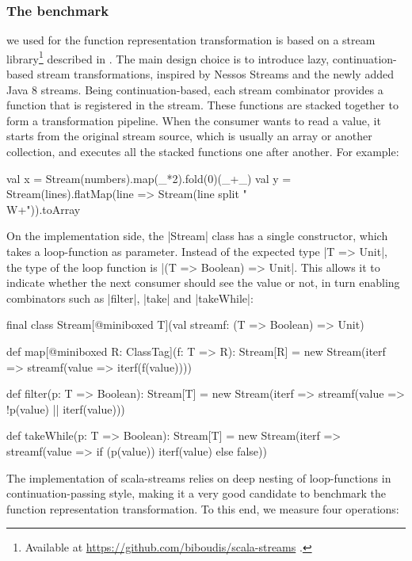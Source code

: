 \subsubsection{The benchmark} we used for the function representation transformation is based on a stream library\footnote{Available at \url{https://github.com/biboudis/scala-streams} .} described in \cite{biboudis_clash_2014}. The main design choice is to introduce lazy, continuation-based stream transformations, inspired by Nessos Streams \cite{nessos_streams} and the newly added Java 8 streams. Being continuation-based, each stream combinator provides a function that is registered in the stream. These functions are stacked together to form a transformation pipeline. When the consumer wants to read a value, it starts from the original stream source, which is usually an array or another collection, and executes all the stacked functions one after another. For example:

\begin{lstlisting-nobreak}
val x = Stream(numbers).map(_*2).fold(0)(_+_)
val y = Stream(lines).flatMap(line => Stream(line split "\\W+")).toArray
\end{lstlisting-nobreak}

On the implementation side, the |Stream| class has a single constructor, which takes a loop-function as parameter. Instead of the expected type |T => Unit|, the type of the loop function is |(T => Boolean) => Unit|. This allows it to indicate whether the next consumer should see the value or not, in turn enabling combinators such as |filter|, |take| and |takeWhile|:

\begin{lstlisting-nobreak}
final class Stream[@miniboxed T](val streamf: (T => Boolean) => Unit) {

  def map[@miniboxed R: ClassTag](f: T => R): Stream[R] =
    new Stream(iterf => streamf(value => iterf(f(value))))

  def filter(p: T => Boolean): Stream[T] =
    new Stream(iterf => streamf(value => !p(value) || iterf(value)))

  def takeWhile(p: T => Boolean): Stream[T] =
    new Stream(iterf => streamf(value => if (p(value)) iterf(value) else false))
}
\end{lstlisting-nobreak}

The implementation of scala-streams relies on deep nesting of loop-functions in continuation-passing style, making it a very good candidate to benchmark the function representation transformation. To this end, we measure four operations:

